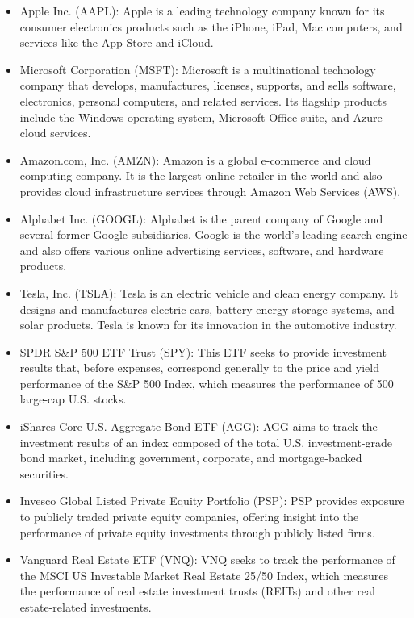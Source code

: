 \begin{itemize}[itemsep=1em]
    \item Apple Inc. (AAPL): Apple is a leading technology company known for its consumer electronics products such as the iPhone, iPad, Mac computers, and services like the App Store and iCloud.
    \item Microsoft Corporation (MSFT): Microsoft is a multinational technology company that develops, manufactures, licenses, supports, and sells software, electronics, personal computers, and related services. Its flagship products include the Windows operating system, Microsoft Office suite, and Azure cloud services.
    \item Amazon.com, Inc. (AMZN): Amazon is a global e-commerce and cloud computing company. It is the largest online retailer in the world and also provides cloud infrastructure services through Amazon Web Services (AWS).
    \item Alphabet Inc. (GOOGL): Alphabet is the parent company of Google and several former Google subsidiaries. Google is the world’s leading search engine and also offers various online advertising services, software, and hardware products.
    \item Tesla, Inc. (TSLA): Tesla is an electric vehicle and clean energy company. It designs and manufactures electric cars, battery energy storage systems, and solar products. Tesla is known for its innovation in the automotive industry.
    \item SPDR S\&P 500 ETF Trust (SPY): This ETF seeks to provide investment results that, before expenses, correspond generally to the price and yield performance of the S\&P 500 Index, which measures the performance of 500 large-cap U.S. stocks.
    \item iShares Core U.S. Aggregate Bond ETF (AGG): AGG aims to track the investment results of an index composed of the total U.S. investment-grade bond market, including government, corporate, and mortgage-backed securities.
    \item Invesco Global Listed Private Equity Portfolio (PSP): PSP provides exposure to publicly traded private equity companies, offering insight into the performance of private equity investments through publicly listed firms.
    \item Vanguard Real Estate ETF (VNQ): VNQ seeks to track the performance of the MSCI US Investable Market Real Estate 25/50 Index, which measures the performance of real estate investment trusts (REITs) and other real estate-related investments.

\end{itemize}
